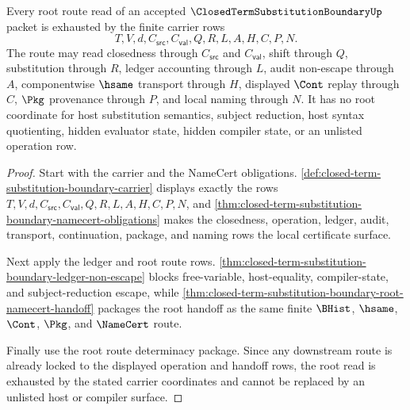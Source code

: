 \begin{theorem}
\label{thm:closed-term-substitution-boundary-root-route-exhaustion}
Every root route read of an accepted $\ClosedTermSubstitutionBoundaryUp$ packet is exhausted by the finite carrier rows
$$
T,V,d,C_{\mathsf{src}},C_{\mathsf{val}},Q,R,L,A,H,C,P,N.
$$
The route may read closedness through $C_{\mathsf{src}}$ and $C_{\mathsf{val}}$, shift through $Q$, substitution through $R$, ledger accounting through $L$, audit non-escape through $A$, componentwise $\hsame$ transport through $H$, displayed $\Cont$ replay through $C$, $\Pkg$ provenance through $P$, and local naming through $N$. It has no root coordinate for host substitution semantics, subject reduction, host syntax quotienting, hidden evaluator state, hidden compiler state, or an unlisted operation row.
\end{theorem}
\begin{proof}
Start with the carrier and the NameCert obligations. \autoref{def:closed-term-substitution-boundary-carrier} displays exactly the rows $T,V,d,C_{\mathsf{src}},C_{\mathsf{val}},Q,R,L,A,H,C,P,N$, and \autoref{thm:closed-term-substitution-boundary-namecert-obligations} makes the closedness, operation, ledger, audit, transport, continuation, package, and naming rows the local certificate surface.

Next apply the ledger and root route rows. \autoref{thm:closed-term-substitution-boundary-ledger-non-escape} blocks free-variable, host-equality, compiler-state, and subject-reduction escape, while \autoref{thm:closed-term-substitution-boundary-root-namecert-handoff} packages the root handoff as the same finite $\BHist$, $\hsame$, $\Cont$, $\Pkg$, and $\NameCert$ route.

Finally use the root route determinacy package. Since any downstream route is already locked to the displayed operation and handoff rows, the root read is exhausted by the stated carrier coordinates and cannot be replaced by an unlisted host or compiler surface.
\end{proof}


